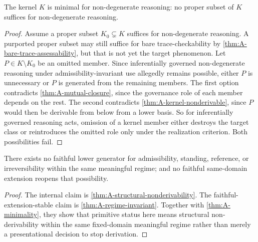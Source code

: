 \begin{theorem}
\label{thm:A-minimality}
The kernel $K$ is minimal for non-degenerate reasoning: no proper subset of $K$ suffices for non-degenerate reasoning.
\end{theorem}

\begin{proof}
Assume a proper subset $K_0\subsetneq K$ suffices for non-degenerate reasoning. A purported proper subset may still suffice for bare trace-checkability by \cref{thm:A-bare-trace-assessability}, but that is not yet the target phenomenon. Let $P\in K\setminus K_0$ be an omitted member. Since inferentially governed non-degenerate reasoning under admissibility-invariant use allegedly remains possible, either $P$ is unnecessary or $P$ is generated from the remaining members. The first option contradicts \cref{thm:A-mutual-closure}, since the governance role of each member depends on the rest. The second contradicts \cref{thm:A-kernel-nonderivable}, since $P$ would then be derivable from below from a lower basis. So for inferentially governed reasoning acts, omission of a kernel member either destroys the target class or reintroduces the omitted role only under the realization criterion. Both possibilities fail.
\end{proof}

\begin{corollary}
\label{cor:A-no-lower-generator}
There exists no faithful lower generator for admissibility, standing, reference, or irreversibility within the same meaningful regime; and no faithful same-domain extension reopens that possibility.
\end{corollary}

\begin{proof}
The internal claim is \cref{thm:A-structural-nonderivability}. The faithful-extension-stable claim is \cref{thm:A-regime-invariant}. Together with \cref{thm:A-minimality}, they show that primitive status here means structural non-derivability within the same fixed-domain meaningful regime rather than merely a presentational decision to stop derivation.
\end{proof}

